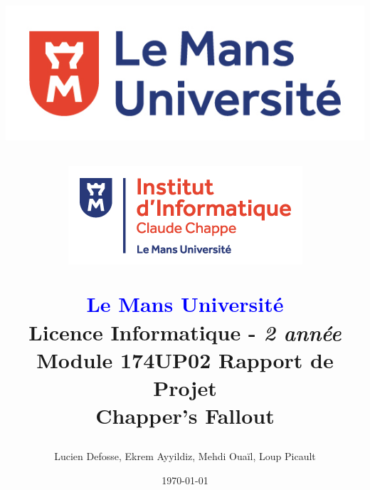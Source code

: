 \title{


    \begin{minipage}[t]{0.4\textwidth}
        \vspace{-2cm}
        \includegraphics[width=\linewidth]{images/universite_logo.jpg}
    \end{minipage}
    \hfill
    \begin{minipage}[t]{0.4\textwidth}
        \vspace{-2cm}
        \includegraphics[width=\linewidth]{images/ic2_logo.png}
    \end{minipage}
    
    \begin{center}
        \textbf{\textcolor{blue}{Le Mans Université}} \\ 
        Licence Informatique - \textit{2 année} \\ 
        Module 174UP02 Rapport de Projet \\
        \textbf{Chapper's Fallout}
    \end{center}
}

\author{
    Lucien Defosse, Ekrem Ayyildiz, Mehdi Ouaïl, Loup Picault
}

\date{\today}


\maketitle

\newpage
\tableofcontents